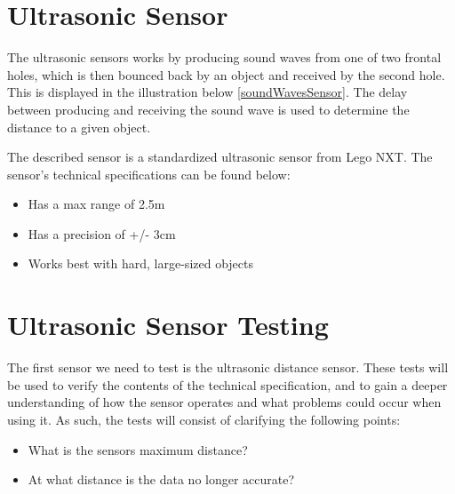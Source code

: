 \section{Ultrasonic Sensor}\label{SensTheoUltra}
The ultrasonic sensors works by producing sound waves from one of two frontal
holes, which is then bounced back by an object and received by the second hole.
This is displayed in the illustration below \autoref{soundWavesSensor}.
The delay between producing and receiving the sound wave is used to determine
the distance to a given object.



The described sensor is a standardized ultrasonic sensor from Lego NXT. The
sensor's technical specifications \citep{Ultrasonic_sensor} can be found below:
\begin{itemize}
  \item Has a max range of 2.5m
  \item Has a precision of +/- 3cm
  \item Works best with hard, large-sized objects
\end{itemize}


\section{Ultrasonic Sensor Testing}\label{SensorTest}
The first sensor we need to test is the ultrasonic distance sensor. These tests
will be used to verify the contents of the technical specification, and
to gain a deeper understanding of how the sensor operates and what
problems could occur when using it. As such, the tests will consist of
clarifying the following points:
\begin{itemize}
  \item What is the sensors maximum distance?
  \item At what distance is the data no longer accurate?
\end{itemize}

